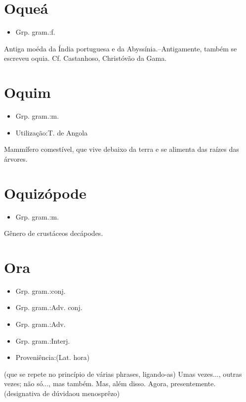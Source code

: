 \section{Oqueá}
\begin{itemize}
\item {Grp. gram.:f.}
\end{itemize}
Antiga moéda da Índia portuguesa e da Abyssínia.--Antigamente, também se escreveu \textunderscore oquia\textunderscore . Cf. Castanhoso, \textunderscore Christóvão da Gama\textunderscore .
\section{Oquim}
\begin{itemize}
\item {Grp. gram.:m.}
\end{itemize}
\begin{itemize}
\item {Utilização:T. de Angola}
\end{itemize}
Mammífero comestível, que vive debaixo da terra e se alimenta das raízes das árvores.
\section{Oquizópode}
\begin{itemize}
\item {Grp. gram.:m.}
\end{itemize}
Gênero de crustáceos decápodes.
\section{Ora}
\begin{itemize}
\item {Grp. gram.:conj.}
\end{itemize}
\begin{itemize}
\item {Grp. gram.:Adv. conj.}
\end{itemize}
\begin{itemize}
\item {Grp. gram.:Adv.}
\end{itemize}
\begin{itemize}
\item {Grp. gram.:Interj.}
\end{itemize}
\begin{itemize}
\item {Proveniência:(Lat. \textunderscore hora\textunderscore )}
\end{itemize}
(que se repete no princípio de várias phrases, ligando-as)
Umas vezes..., outras vezes; não só..., mas também.
Mas, além disso.
Agora, presentemente.
(designativa de \textunderscore dúvida\textunderscore  ou \textunderscore menosprêzo\textunderscore )
